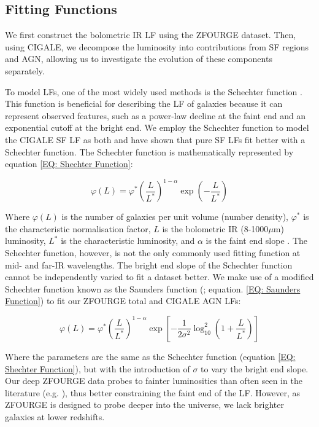 \subsection{Fitting Functions}

We first construct the bolometric IR LF using the ZFOURGE dataset. Then, using CIGALE, we decompose the luminosity into contributions from SF regions and AGN, allowing us to investigate the evolution of these components separately.

To model LFs, one of the most widely used methods is the Schechter function \citep{schechter_analytic_1976}. This function is beneficial for describing the LF of galaxies because it can represent observed features, such as a power-law decline at the faint end and an exponential cutoff at the bright end. We employ the Schechter function to model the CIGALE SF LF as both \cite{fu_decomposing_2010} and \cite{wu_mid-infrared_2011} have shown that pure SF LFs fit better with a Schechter function. The Schechter function is mathematically represented by equation \ref{EQ: Shechter Function}:

\begin{equation} 
    \varphi(L) = \varphi^* \left(\frac{L}{L^*}\right)^{1-\alpha} \exp\left(-\frac{L}{L^*}\right) 
    \label{EQ: Shechter Function}
\end{equation}

Where $\varphi(L)$ is the number of galaxies per unit volume (number density), $\varphi^*$ is the characteristic normalisation factor, $L$ is the bolometric IR (8-1000$\mu$m) luminosity, $L^*$ is the characteristic luminosity, and $\alpha$ is the faint end slope \citep{schechter_analytic_1976}. The Schechter function, however, is not the only commonly used fitting function at mid- and far-IR wavelengths. The bright end slope of the Schechter function cannot be independently varied to fit a dataset better. We make use of a modified Schechter function known as the Saunders function (\citealp{saunders_60-mum_1990}; equation. \ref{EQ: Saunders Function}) to fit our ZFOURGE total and CIGALE AGN LFs:

\begin{equation} 
    \varphi(L) = \varphi^* \left(\frac{L}{L^*}\right)^{1-\alpha} \exp\left[-\frac{1}{2\sigma^2}\log_{10}^2\left(1+\frac{L}{L^*}\right)\right]
    \label{EQ: Saunders Function}
\end{equation}

Where the parameters are the same as the Schechter function (equation \ref{EQ: Shechter Function}), but with the introduction of $\sigma$ to vary the bright end slope. Our deep ZFOURGE data probes to fainter luminosities than often seen in the literature (e.g. \citealp{rodighiero_mid-_2010, gruppioni_herschel_2013}), thus better constraining the faint end of the LF. However, as ZFOURGE is designed to probe deeper into the universe, we lack brighter galaxies at lower redshifts. 

